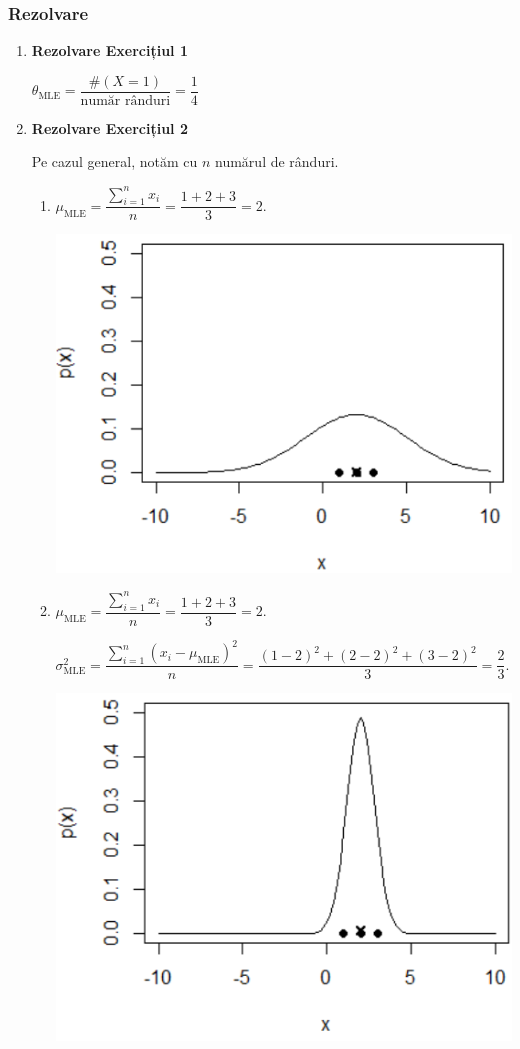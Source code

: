 \documentclass[12pt]{article}
\begin{document}
	\subsubsection{Rezolvare}
	\begin{enumerate}
		\item \textbf{Rezolvare Exercițiul 1}
		
		$\theta_\text{MLE} = \dfrac{\#(X=1)}{\text{număr rânduri}} = \dfrac{1}{4}$
		
		\item \textbf{Rezolvare Exercițiul 2}
		
		Pe cazul general, notăm cu $n$ numărul de rânduri.
		\begin{enumerate}
			\item $\mu_\text{MLE} = \dfrac{\sum_{i=1}^{n}x_i}{n} = \dfrac{1+2+3}{3} = 2$.
			\begin{center}
				\includegraphics{screenshot007}
			\end{center}
			\item $\mu_\text{MLE} = \dfrac{\sum_{i=1}^{n}x_i}{n} = \dfrac{1+2+3}{3} = 2$.
			
			$\sigma_\text{MLE}^2 = \dfrac{\sum_{i=1}^{n}(x_i - \mu_\text{MLE})^2}{n} = \dfrac{(1-2)^2 + (2-2)^2 + (3-2)^2}{3} = \dfrac{2}{3}$.
			\begin{center}
				\includegraphics{screenshot008}
			\end{center}
			

\end{enumerate}
\end{enumerate}
\end{document}
